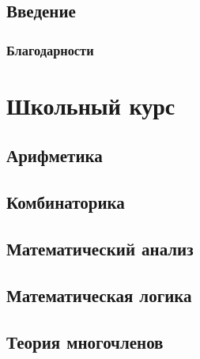 \documentclass{report}
\begin{document}
\chapter*{Введение}

\section*{Благодарности}

\tableofcontents

\part{Школьный курс}
\chapter{Арифметика}

	
	
	
\chapter{Комбинаторика}

\chapter{Математический анализ}

	
	
	
	
	
	

	
	
\chapter{Математическая логика}

\chapter{Теория многочленов}

	
	
\end{document}
